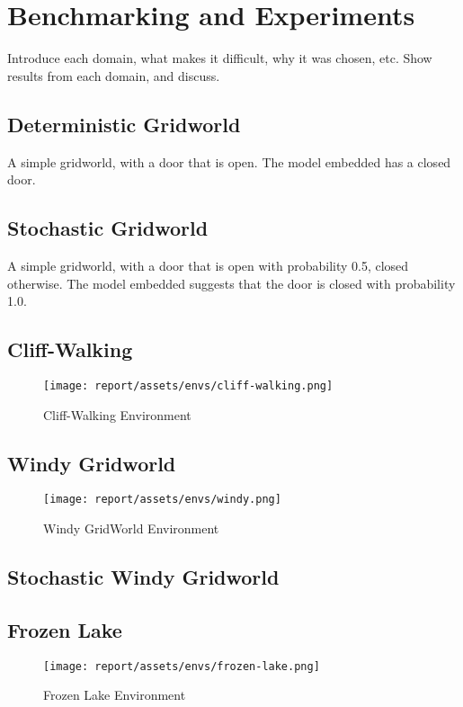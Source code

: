 \chapter{Benchmarking and Experiments}
\label{chapter5}
Introduce each domain, what makes it difficult, why it was chosen, etc. Show results from each domain, and discuss.
\cite{osband2020bsuite, 1606.01540}
\section{Deterministic Gridworld}
A simple gridworld, with a door that is open. The model embedded has a closed door.
\section{Stochastic Gridworld}
A simple gridworld, with a door that is open with probability 0.5, closed otherwise. The model embedded suggests that the door is closed with probability 1.0.
\section{Cliff-Walking}
\begin{figure}[h!]
    \centering
    \texttt{[image: report/assets/envs/cliff-walking.png]}
    \caption{Cliff-Walking Environment \cite{Sutton1998}}
    \label{fig:cliff-walking}
\end{figure}
\cite{1606.01540, Sutton1998}
\section{Windy Gridworld}
\begin{figure}[h!]
    \centering
    \texttt{[image: report/assets/envs/windy.png]}
    \caption{Windy GridWorld Environment \cite{Sutton1998}}
    \label{fig:windy}
\end{figure}
\cite{Sutton1998}
\section{Stochastic Windy Gridworld}
\section{Frozen Lake}
\begin{figure}[h!]
    \centering
    \texttt{[image: report/assets/envs/frozen-lake.png]}
    \caption{Frozen Lake Environment \cite{1606.01540}}
    \label{fig:frozen}
\end{figure}
\cite{1606.01540}
